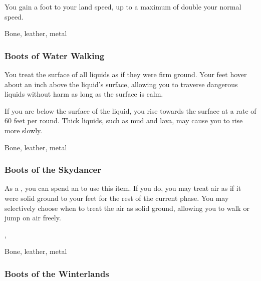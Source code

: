 You gain a  foot  to your land speed, up to a maximum of double your normal speed.



 


 Bone, leather, metal


\lowercase{\hypertarget{item:Boots of Water Walking}{}}\label{item:Boots of Water Walking}
\hypertarget{item:Boots of Water Walking}{\subsubsection{Boots of Water Walking\hfill{}}}

You treat the surface of all liquids as if they were firm ground.
Your feet hover about an inch above the liquid's surface, allowing you to traverse dangerous liquids without harm as long as the surface is calm.

If you are below the surface of the liquid, you rise towards the surface at a rate of 60 feet per round.
Thick liquids, such as mud and lava, may cause you to rise more slowly.



 Bone, leather, metal


\lowercase{\hypertarget{item:Boots of the Skydancer}{}}\label{item:Boots of the Skydancer}
\hypertarget{item:Boots of the Skydancer}{\subsubsection{Boots of the Skydancer\hfill{}}}

As a , you can spend an  to use this item.
If you do, you may treat air as if it were solid ground to your feet for the rest of the current phase.
You may selectively choose when to treat the air as solid ground, allowing you to walk or jump on air freely.



 , 


 Bone, leather, metal


\lowercase{\hypertarget{item:Boots of the Winterlands}{}}\label{item:Boots of the Winterlands}
\hypertarget{item:Boots of the Winterlands}{\subsubsection{Boots of the Winterlands\hfill{}}}

